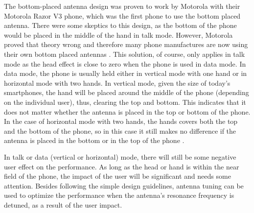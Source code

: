 The bottom-placed antenna design was proven to work by Motorola with their Motorola Razor V3 phone, which was the first phone to use the bottom placed antenna. There were some skeptics to this design, as the bottom of the phone would be placed in the middle of the hand in talk mode. However, Motorola proved that theory wrong and therefore many phone manufactures are now using their own bottom placed antennas \cite{Zhijun2011antdesign}. This solution, of course, only applies in talk mode as the head effect is close to zero when the phone is used in data mode. In data mode, the phone is usually held either in vertical mode with one hand or in horizontal mode with two hands. In vertical mode, given the size of today's smartphones, the hand will be placed around the middle of the phone (depending on the individual user), thus, clearing the top and bottom. This indicates that it does not matter whether the antenna is placed in the top or bottom of the phone. In the case of horizontal mode with two hands, the hands covers both the top and the bottom of the phone, so in this case it still makes no difference if the antenna is placed in the bottom or in the top of the phone \cite{Zhijun2011antdesign}.

In talk or data (vertical or horizontal) mode, there will still be some negative user effect on the performance. As long as the head or hand is within the near field of the phone, the impact of the user will be significant and needs some attention. Besides following the simple design guidelines, antenna tuning can be used to optimize the performance when the antenna's resonance frequency is detuned, as a result of the user impact.

